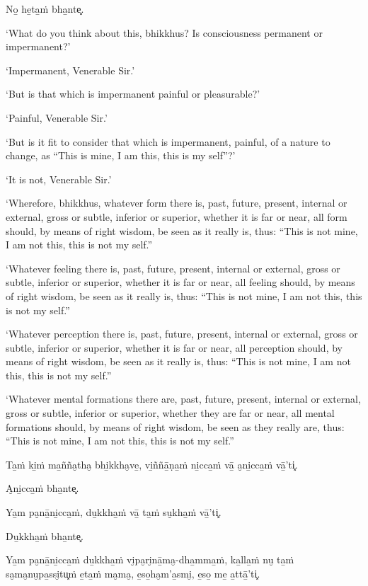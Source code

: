 No̱ he̱ta̱ṁ bha̱nte͓.

\clearpage

\englishText
\markboth{\englishTitle}{\rightmark}

‘What do you think about this, bhikkhus? Is consciousness permanent or
impermanent?’

‘Impermanent, Venerable Sir.’

‘But is that which is impermanent painful or pleasurable?’

‘Painful, Venerable Sir.’

‘But is it fit to consider that which is impermanent, painful, of a
nature to change, as “This is mine, I am this, this is my self”?’

‘It is not, Venerable Sir.’

‘Wherefore, bhikkhus, whatever form there is, past, future, present,
internal or external, gross or subtle, inferior or superior, whether it
is far or near, all form should, by means of right wisdom, be seen as it
really is, thus: “This is not mine, I am not this, this is not my self.”

‘Whatever feeling there is, past, future, present, internal or
external, gross or subtle, inferior or superior, whether it is far or
near, all feeling should, by means of right wisdom, be seen as it really
is, thus: “This is not mine, I am not this, this is not my self.”

‘Whatever perception there is, past, future, present, internal or
external, gross or subtle, inferior or superior, whether it is far or
near, all perception should, by means of right wisdom, be seen as it really
is, thus: “This is not mine, I am not this, this is not my self.”

‘Whatever mental formations there are, past, future, present, internal
or external, gross or subtle, inferior or superior, whether they are far
or near, all mental formations should, by means of right wisdom, be seen
as they really are, thus: “This is not mine, I am not this, this is not
my self.”

\clearpage

\paliText
\markboth{\paliTitle}{\rightmark}

Ta̱ṁ ki̱ṁ ma̱ñña̮tha̮ bhi̱kkha̮ve̱, vi̱ññā̱ṇa̱ṁ ni̱cca̱ṁ vā̱ a̮ni̱cca̱ṁ vā̱'ti͓.

A̮ni̱cca̱ṁ bha̱nte͓.

Ya̱m pa̮nā̱ni̱cca̱ṁ, du̱kkha̱ṁ vā̱ ta̱ṁ su̮kha̱ṁ vā̱'ti͓.

Du̱kkha̱ṁ bha̱nte͓.

Ya̱m pa̮nā̱ni̱cca̱ṁ du̱kkha̱ṁ vi̮pa̮ri̮nā̱ma̮-dha̱mma̱ṁ, ka̱lla̱ṁ nu̮ ta̱ṁ sa̮ma̮nu̮pa̱ssi̮tu͓ṁ
e̱ta̱ṁ ma̮ma̮, e̱so̱ha̮m'a̱smi̮, e̱so̱ me̱ a̱ttā̱'ti͓.

